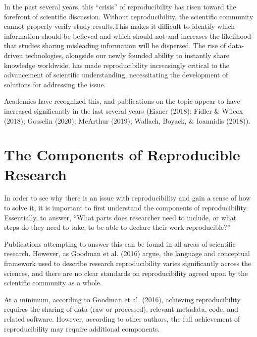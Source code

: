 \documentclass[12pt,twoside]{reedthesis}
\begin{document}
In the past several years, this ``crisis'' of reproducibility has risen toward the forefront of scientific discussion. Without reproducibility, the scientific community cannot properly verify study results.This makes it difficult to identify which information should be believed and which should not and increases the likelihood that studies sharing misleading information will be dispersed. The rise of data-driven technologies, alongside our newly founded ability to instantly share knowledge worldwide, has made reproducibility increasingly critical to the advancement of scientific understanding, necessitating the development of solutions for addressing the issue.

Academics have recognized this, and publications on the topic appear to have increased significantly in the last several years (Eisner (2018); Fidler \& Wilcox (2018); Gosselin (2020); McArthur (2019); Wallach, Boyack, \& Ioannidis (2018)).

\hypertarget{the-components-of-reproducible-research}{%
\section{The Components of Reproducible Research}\label{the-components-of-reproducible-research}}

In order to see why there is an issue with reproducibility and gain a sense of how to solve it, it is important to first understand the components of reproducibility. Essentially, to answer, ``What parts does researcher need to include, or what steps do they need to take, to be able to declare their work reproducible?''

Publications attempting to answer this can be found in all areas of scientific research. However, as Goodman et al. (2016) argue, the language and conceptual framework used to describe research reproducibility varies significantly across the sciences, and there are no clear standards on reproducibility agreed upon by the scientific community as a whole.

At a minimum, according to Goodman et al. (2016), achieving reproducibility requires the sharing of data (raw or processed), relevant metadata, code, and related software. However, according to other authors, the full achievement of reproducibility may require additional components.
\end{document}
